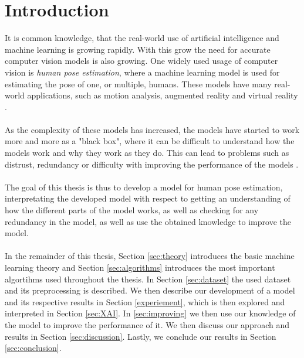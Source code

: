 \documentclass[./main.tex]{subfiles}
\begin{document}
\section{Introduction}
It is common knowledge, that the real-world use of artificial intelligence and machine learning is growing rapidly. With this grow the need for accurate computer vision models is also growing. One widely used usage of computer vision is \textit{human pose estimation}, where a machine learning model is used for estimating the pose of one, or multiple, humans. These models have many real-world applications, such as motion analysis, augmented reality and virtual reality \cite{survey_2}.
\\
\\
As the complexity of these models has increased, the models have started to work more and more as a "black box", where it can be difficult to understand how the models work and why they work as they do. This can lead to problems such as distrust, redundancy or difficulty with improving the performance of the models \cite{Selvaraju}.
\\
\\
The goal of this thesis is thus to develop a model for human pose estimation, interpretating the developed model with respect to getting an understanding of how the different parts of the model works, as well as checking for any redundancy in the model, as well as use the obtained knowledge to improve the model.
\\
\\
In the remainder of this thesis, Section \ref{sec:theory} introduces the basic machine learning theory and Section \ref{sec:algorithms} introduces the most important algortihms used throughout the thesis. In Section \ref{sec:dataset} the used dataset and its preprocessing is described. We then describe our development of a model and its respective results in Section \ref{experiement}, which is then explored and interpreted in Section \ref{sec:XAI}. In \ref{sec:improving} we then use our knowledge of the model to improve the performance of it. We then discuss our approach and results in Section \ref{sec:discussion}. Lastly, we conclude our results in Section \ref{sec:conclusion}.
\end{document}
